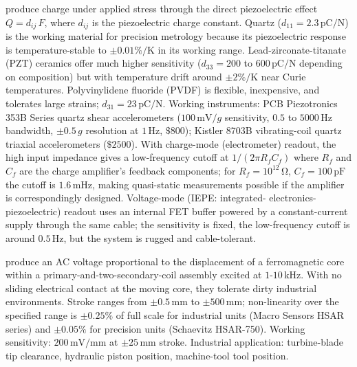  produce charge under applied
stress through the direct piezoelectric effect $Q = d_{ij}\,F$,
where $d_{ij}$ is the piezoelectric charge constant. Quartz
($d_{11} = 2.3\,\si{\pico\coulomb\per\newton}$) is the working
material for precision metrology because its piezoelectric
response is temperature-stable to $\pm 0.01\%/\si{\kelvin}$ in
its working range. Lead-zirconate-titanate (PZT) ceramics offer
much higher sensitivity ($d_{33} = 200$ to $600\,\si{\pico
\coulomb\per\newton}$ depending on composition) but with
temperature drift around $\pm 2\%/\si{\kelvin}$ near Curie
temperatures. Polyvinylidene fluoride (PVDF) is flexible,
inexpensive, and tolerates large strains; $d_{31} = 23\,\si{
\pico\coulomb\per\newton}$. Working instruments: PCB Piezotronics
353B Series quartz shear accelerometers ($100\,\si{\milli\volt
\per g}$ sensitivity, $0.5$ to $5000\,\si{\hertz}$ bandwidth,
$\pm 0.5\,g$ resolution at $1\,\si{\hertz}$, $\$800$); Kistler
8703B vibrating-coil quartz triaxial accelerometers ($\$2500$).
With charge-mode (electrometer) readout, the high input impedance
gives a low-frequency cutoff at $1/(2\pi R_{f} C_{f})$ where
$R_{f}$ and $C_{f}$ are the charge amplifier's feedback
components; for $R_{f} = 10^{12}\,\si{\ohm}$, $C_{f} = 100\,\si{
\pico\farad}$ the cutoff is $1.6\,\si{\milli\hertz}$, making
quasi-static measurements possible if the amplifier is
correspondingly designed. Voltage-mode (IEPE: integrated-
electronics-piezoelectric) readout uses an internal FET buffer
powered by a constant-current supply through the same cable; the
sensitivity is fixed, the low-frequency cutoff is around
$0.5\,\si{\hertz}$, but the system is rugged and cable-tolerant.

produce an AC voltage proportional to the displacement of a
ferromagnetic core within a primary-and-two-secondary-coil
assembly excited at $1$-$10\,\si{\kilo\hertz}$. With no sliding
electrical contact at the moving core, they tolerate dirty
industrial environments. Stroke ranges from $\pm 0.5\,\si{\milli
\meter}$ to $\pm 500\,\si{\milli\meter}$; non-linearity over the
specified range is $\pm 0.25\%$ of full scale for industrial
units (Macro Sensors HSAR series) and $\pm 0.05\%$ for precision
units (Schaevitz HSAR-750). Working sensitivity: $200\,\si{\milli
\volt\per\milli\meter}$ at $\pm 25\,\si{\milli\meter}$ stroke.
Industrial application: turbine-blade tip clearance, hydraulic
piston position, machine-tool tool position.

